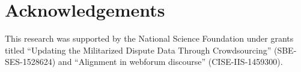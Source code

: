 \section*{Acknowledgements}
This research was supported by the National Science Foundation under grants titled ``Updating the Militarized Dispute Data Through Crowdsourcing'' (SBE-SES-1528624) and ``Alignment in webforum discourse'' (CISE-IIS-1459300).